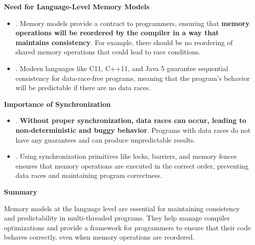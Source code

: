 \highspace
\begin{flushleft}
    \textcolor{Green3}{ \textbf{Need for Language-Level Memory Models}}
\end{flushleft}
\begin{itemize}
    \item {}. Memory models provide a contract to programmers, ensuring that \textbf{memory operations will be reordered by the compiler in a way that maintains consistency}. For example, there should be no reordering of shared memory operations that could lead to race conditions.
    \item {}. Modern languages like C11, C++11, and Java 5 guarantee sequential consistency for data-race-free programs, meaning that the program's behavior will be predictable if there are no data races.
\end{itemize}

\highspace
\begin{flushleft}
    \textcolor{Red2}{ \textbf{Importance of Synchronization}}
\end{flushleft}
\begin{itemize}
    \item {}. \textbf{Without proper synchronization, data races can occur, leading to non-deterministic and buggy behavior}. Programs with data races do not have any guarantees and can produce unpredictable results.
    \item {}. Using synchronization primitives like locks, barriers, and memory fences ensures that memory operations are executed in the correct order, preventing data races and maintaining program correctness.
\end{itemize}

\highspace
\begin{flushleft}
    \textcolor{Green3}{ \textbf{Summary}}
\end{flushleft}
Memory models at the language level are essential for maintaining consistency and predictability in multi-threaded programs. They help manage compiler optimizations and provide a framework for programmers to ensure that their code behaves correctly, even when memory operations are reordered.
